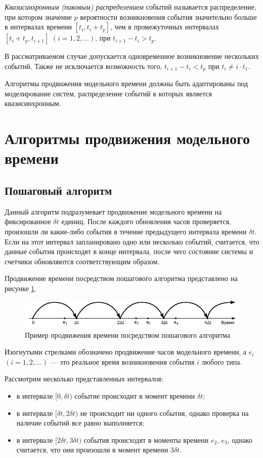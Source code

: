 \textit{Квазисинхронным (пиковым) распределением} событий называется распределение, при котором значение $p$ вероятности возникновения события значительно больше в интервалах времени $[t_i, t_i + t_p]$, чем в промежуточных интервалах $[t_i + t_p, t_{i+1}]$ $(i = 1, 2, ...)$, при $t_{i+1} - t_i > t_p$.

В рассматриваемом случае допускается одновременное возникновение нескольких событий. Также не исключается возможность того, $t_{i+1} - t_i < t_p$ при $t_i \neq i \cdot t_1$.


Алгоритмы продвижения модельного времени должны быть адаптированы под моделирование систем, распределение событий в которых является квазисинхронным.

\section{Алгоритмы продвижения модельного времени}

\subsection{Пошаговый алгоритм}
Данный алгоритм подразумевает продвижение модельного времени на фиксированное $\delta t$ единиц. После каждого обновления часов проверяется, произошли ли какие-либо события в течение предыдущего интервала времени $\delta t$. Если на этот интервал запланировано одно или несколько событий, считается, что данные события происходят в конце интервала, после чего состояние системы и счетчики обновляются соответствующим образом. 

Продвижение времени посредством пошагового алгоритма представлено на рисунке \ref{img:delta_t_example}.

\begin{figure}[h!btp]
	\centering
	\includegraphics[width=0.7\columnwidth]{inc/img/delta_t_example.pdf}
	\caption{Пример продвижения времени посредством пошагового алгоритма}
	\label{img:delta_t_example}	
\end{figure}

Изогнутыми стрелками обозначено продвижение часов модельного времени, а $e_i$ $(i = 1, 2, ...)$ --- это реальное время возникновения события $i$ любого типа.

Рассмотрим несколько представленных интервалов:
\begin{itemize}
	\item в интервале $[0, \delta t)$ событие происходит в момент времени $\delta t$;
	\item в интервале $[\delta t, 2\delta t)$ не происходит ни одного события, однако проверка на наличие событий все равно выполняется;
	\item в интервале $[2\delta t, 3\delta t)$ события происходят в моменты времени $e_2$, $e_3$, однако считается, что они произошли в момент времени $3\delta t$.
\end{itemize}

